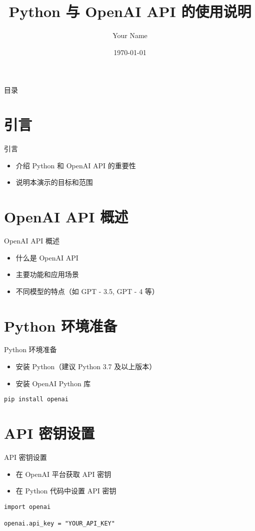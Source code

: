 \documentclass{beamer}
\title{Python 与 OpenAI API 的使用说明}
\author{Your Name}
\date{\today}
\begin{document}
\begin{frame}
    \titlepage
\end{frame}

\begin{frame}{目录}
    \tableofcontents
\end{frame}

\section{引言}
\begin{frame}{引言}
    \begin{itemize}
        \item 介绍 Python 和 OpenAI API 的重要性
        \item 说明本演示的目标和范围
    \end{itemize}
\end{frame}

\section{OpenAI API 概述}
\begin{frame}{OpenAI API 概述}
    \begin{itemize}
        \item 什么是 OpenAI API
        \item 主要功能和应用场景
        \item 不同模型的特点（如 GPT - 3.5, GPT - 4 等）
    \end{itemize}
\end{frame}

\section{Python 环境准备}
\begin{frame}{Python 环境准备}
    \begin{itemize}
        \item 安装 Python（建议 Python 3.7 及以上版本）
        \item 安装 OpenAI Python 库
    \end{itemize}
    \begin{lstlisting}[style=pythonstyle]
pip install openai
    \end{lstlisting}
\end{frame}

\section{API 密钥设置}
\begin{frame}{API 密钥设置}
    \begin{itemize}
        \item 在 OpenAI 平台获取 API 密钥
        \item 在 Python 代码中设置 API 密钥
    \end{itemize}
    \begin{lstlisting}[style=pythonstyle]
import openai

openai.api_key = "YOUR_API_KEY"
    \end{lstlisting}
\end{frame}
\end{document}
